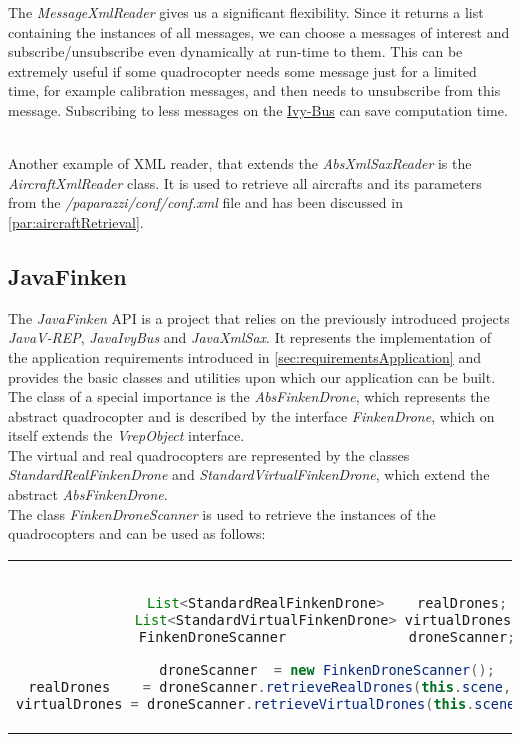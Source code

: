 The \textit{MessageXmlReader} gives us a significant flexibility. Since it returns a list containing the instances of all messages, we can choose a messages of interest and subscribe/unsubscribe even dynamically at run-time to them. This can be extremely useful if some quadrocopter needs some message just for a limited time, for example calibration messages, and then needs to unsubscribe from this message. Subscribing to less messages on the \hyperref[sec:ivyBusImplementation]{Ivy-Bus} can save computation time. \

Another example of XML reader, that extends the \textit{AbsXmlSaxReader} is the \textit{AircraftXmlReader} class. It is used to retrieve all aircrafts and its parameters from the 
\textit{/paparazzi/conf/conf.xml} file and has been discussed in \ref{par:aircraftRetrieval}. 


\subsection{JavaFinken}
\label{sec:javaFinkenImplementation}

The \textit{JavaFinken} API is a project that relies on the previously introduced projects \textit{JavaV-REP}, \textit{JavaIvyBus} and \textit{JavaXmlSax}. It represents the implementation of the application requirements introduced in \ref{sec:requirementsApplication} and provides the basic classes and utilities upon which our application can be built.\\

The class of a special importance is the \textit{AbsFinkenDrone}, which represents the abstract quadrocopter and is described by the interface \textit{FinkenDrone}, which on itself extends the \textit{VrepObject} interface.\\
The virtual and real quadrocopters are represented by the classes \textit{StandardRealFinkenDrone} and \textit{StandardVirtualFinkenDrone}, which extend the abstract \textit{AbsFinkenDrone}.\\
The class \textit{FinkenDroneScanner} is used to retrieve the instances of the quadrocopters and can be used as follows:

\begin{center}
\begin{tabular}{c}
\begin{lstlisting}[basicstyle=\small, language=Java]

List<StandardRealFinkenDrone>    realDrones;
List<StandardVirtualFinkenDrone> virtualDrones;
FinkenDroneScanner               droneScanner;

droneScanner  = new FinkenDroneScanner();
realDrones    = droneScanner.retrieveRealDrones(this.scene, this.client);
virtualDrones = droneScanner.retrieveVirtualDrones(this.scene, this.client);

\end{lstlisting}
\end{tabular}
\end{center}

